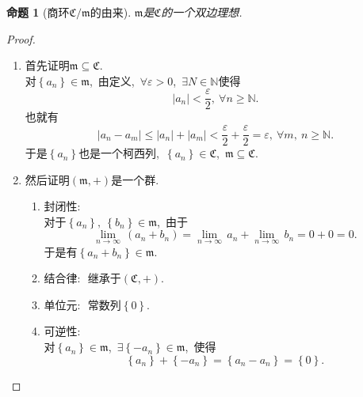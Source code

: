 \documentclass[UTF8, twoside]{ctexart}
\theoremstyle{nonumberplain}
\newtheorem{proof}{\heiti 证明}  %
\theoremstyle{nonumberplain}
\theoremstyle{plain}
\newtheorem{mingti}[dingyi]{命题}
\begin{document}
	\begin{mingti}[商环$\mathfrak{C}/\mathfrak{m}$的由来]
		\label{202101310732-2}
		$\mathfrak{m}$是$\mathfrak{C}$的一个双边理想.\ 
	\end{mingti}
	\begin{proof}
		\ 
		\begin{enumerate}
			\item 首先证明$\mathfrak{m}\subseteq \mathfrak{C}$.\ \\
			对$\left\{ {{a}_{n}} \right\}\in \mathfrak{m}$,\ 由定义,\ $\forall \varepsilon >0$,\ $\exists N\in \mathbb{N}$使得
			\[
				\left| {{a}_{n}} \right|<\frac{\varepsilon }{2},
				\ \forall n\ge \mathbb{N}.
			\]
			也就有
			\[
			\left| {{a}_{n}}-{{a}_{m}} \right|\le \left| {{a}_{n}} \right|+\left| {{a}_{m}} \right|<\frac{\varepsilon }{2}+\frac{\varepsilon }{2}=\varepsilon ,\ \forall m,\ n\ge \mathbb{N}.	
			\]
			于是$\left\{ {{a}_{n}} \right\}$也是一个柯西列,\ $\left\{ {{a}_{n}} \right\}\in \mathfrak{C}$,\ $\mathfrak{m}\subseteq \mathfrak{C}$.
			\vskip 0.3cm
			
			\item 然后证明$\left( \mathfrak{m},+ \right)$是一个群.\ 
			\begin{enumerate}
				\item 封闭性$:$\ \\
				对于$\left\{ {{a}_{n}} \right\},\ \left\{ {{b}_{n}} \right\}\in \mathfrak{m}$,\ 由于
				\[
					\underset{n\to \infty }{\mathop{\lim }}\,\left( {{a}_{n}}+{{b}_{n}} \right)=\underset{n\to \infty }{\mathop{\lim }}\,{{a}_{n}}+\underset{n\to \infty }{\mathop{\lim }}\,{{b}_{n}}=0+0=0.
				\]
				于是有$\left\{ {{a}_{n}}+{{b}_{n}} \right\}\in \mathfrak{m}$.\ 
				
				\item 结合律$:$\ 继承于$\left( \mathfrak{C},+ \right)$.\ 
				
				\item 单位元$:$\ 常数列$\left\{ 0 \right\}$.\ 
				
				\item 可逆性$:$\ \\
				对$\left\{ {{a}_{n}} \right\}\in \mathfrak{m}$,\ $\exists \left\{ -{{a}_{n}} \right\}\in \mathfrak{m}$,\ 使得
				\[
					\left\{ {{a}_{n}} \right\}+\left\{ -{{a}_{n}} \right\}=\left\{ {{a}_{n}}-{{a}_{n}} \right\}=\left\{ 0 \right\}.
				\]
			\end{enumerate}
			\vskip 0.3cm
			

\end{enumerate}
\end{proof}
\end{document}

